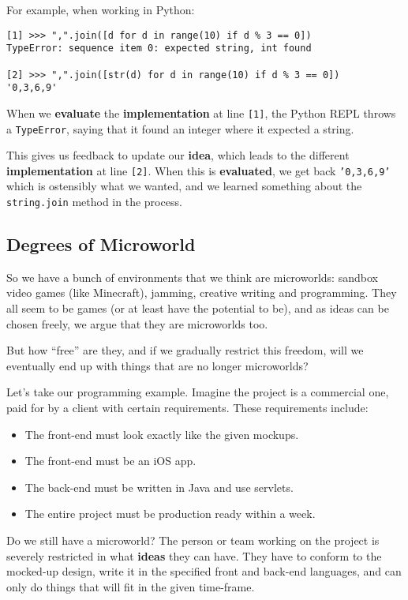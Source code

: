 For example, when working in Python:

\begin{verbatim}
[1] >>> ",".join([d for d in range(10) if d % 3 == 0])
TypeError: sequence item 0: expected string, int found

[2] >>> ",".join([str(d) for d in range(10) if d % 3 == 0])
'0,3,6,9'
\end{verbatim}

When we \textbf{evaluate} the \textbf{implementation} at line \texttt{[1]}, the Python REPL throws a \texttt{TypeError}, saying that it found an integer where it expected a string. 

This gives us feedback to update our \textbf{idea}, which leads to the different \textbf{implementation} at line \texttt{[2]}. When this is \textbf{evaluated}, we get back \texttt{'0,3,6,9'} which is ostensibly what we wanted, and we learned something about the \texttt{string.join} method in the process.

\subsection{Degrees of Microworld}

So we have a bunch of environments that we think are microworlds:
sandbox video games (like Minecraft), jamming, creative writing and
programming. They all seem to be games (or at least have the potential
to be), and as ideas can be chosen freely, we argue that they are
microworlds too.

But how ``free'' are they, and if we gradually restrict this freedom,
will we eventually end up with things that are no longer microworlds?

Let's take our programming example. Imagine the project is a commercial
one, paid for by a client with certain requirements. These requirements
include: 

\begin{itemize}

\item The front-end must look exactly like the given mockups. 
\item The front-end must be an iOS app. 
\item The back-end must be written in Java and use servlets. 
\item The entire project must be production ready within a week.

\end{itemize}

Do we still have a microworld? The person or team working on the project
is severely restricted in what \textbf{ideas} they can have. They have
to conform to the mocked-up design, write it in the specified front and
back-end languages, and can only do things that will fit in the given
time-frame.

